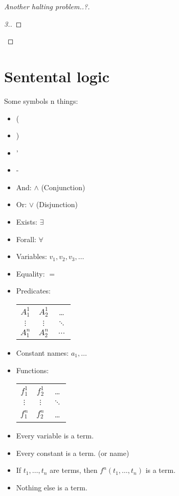 \begin{proof}[Another halting problem..?]
\begin{proof}[3.]
\end{proof}
\end{proof}


\section{Sentental logic}
Some symbols n things:
\begin{itemize}
\item ( 
\item ) 
\item ' %
\item - %
\item And: $\wedge$ (Conjunction)
\item Or: $\vee$ (Disjunction)
\item Exists: $\exists$ 
\item Forall: $\forall$
\item Variables: $v_1, v_2, v_3, \dots$
\item Equality: $=$
\item Predicates: \begin{tabular}{c c c}
 $A^{1}_1$ & $A^{1}_2$  & \dots \\
 $\vdots $ & $\vdots$   & $\ddots$ \\
 $A^{n}_1$ & $A^{n}_2$  & $\dots$ \\
\end{tabular}
\item Constant names: $a_1, \dots$
\item Functions: \begin{tabular}{c c c}
 $f^{1}_1$ & $f^{1}_2$ & \dots \\
 $\vdots$    & $\vdots$ & $\ddots$ \\
 $f^{n}_1$ & $f^{n}_2$ & \dots \\
\end{tabular}
\end{itemize}


\begin{definition}[Term]
\begin{itemize}
\item Every variable is a term.
\item Every constant is a term. (or name)
\item If $t_1,\dots,t_n$ are terms, then $f^n(t_1,\dots,t_n)$ is a term.  
\item Nothing else is a term.
\end{itemize}
\end{definition}

